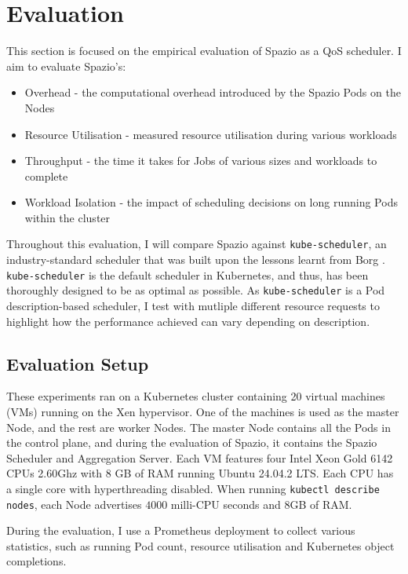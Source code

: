 \chapter{Evaluation}

This section is focused on the empirical evaluation of Spazio as a QoS
scheduler. I aim to evaluate Spazio's:
\begin{itemize}
    \item Overhead - the computational overhead introduced by the Spazio Pods on
        the Nodes
    \item Resource Utilisation - measured resource utilisation during various
        workloads
    \item Throughput - the time it takes for Jobs of various sizes and workloads
        to complete
    \item Workload Isolation - the impact of scheduling decisions on long
        running Pods within the cluster
\end{itemize}
Throughout this evaluation, I will compare Spazio against
\texttt{kube-scheduler}, an industry-standard scheduler that was built upon the
lessons learnt from Borg \cite{}. \texttt{kube-scheduler} is the default
scheduler in Kubernetes, and thus, has been thoroughly designed to be as optimal
as possible. As \texttt{kube-scheduler} is a Pod description-based scheduler, I
test with mutliple different resource requests to highlight how the performance
achieved can vary depending on description.

\section{Evaluation Setup}
These experiments ran on a Kubernetes cluster containing 20 virtual machines
(VMs) running on the Xen hypervisor. One of the machines is used as the master
Node, and the rest are worker Nodes. The master Node contains all the Pods in
the control plane, and during the evaluation of Spazio, it contains the Spazio
Scheduler and Aggregation Server. Each VM features four Intel Xeon Gold 6142
CPUs \@ 2.60Ghz with 8 GB of RAM running Ubuntu 24.04.2 LTS. Each CPU has a
single core with hyperthreading disabled. When running \texttt{kubectl describe
nodes}, each Node advertises $4000$ milli-CPU seconds and 8GB of RAM.

During the evaluation, I use a Prometheus deployment \cite{} to collect various
statistics, such as running Pod count, resource utilisation and Kubernetes
object completions.

